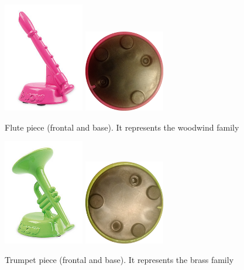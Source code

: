 \begin{figure}[ht!]
	\centering
	\includegraphics[width=100pt]{graphics/architecture/pieces/pieceWoodwind.jpg}
	\vspace{0.6cm}
	\includegraphics[width=100pt]{graphics/architecture/pieces/woodwindBase.png}
	\caption{Flute piece (frontal and base). It represents the woodwind family}
	\label{fig:woodwindpiece}
\end{figure}

\begin{figure}[ht!]
	\centering
	\includegraphics[width=100pt]{graphics/architecture/pieces/pieceBrass.jpg}
	\vspace{0.6cm}
	\includegraphics[width=100pt]{graphics/architecture/pieces/brassBase.png}
	\caption{Trumpet piece (frontal and base). It represents the brass family}
	\label{fig:brasspiece}
\end{figure}
\FloatBarrier

